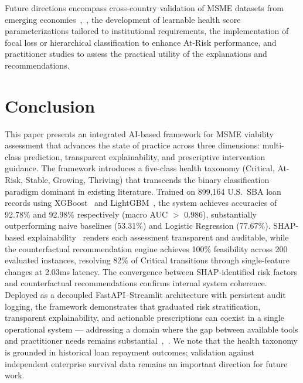 \documentclass[conference]{IEEEtran}
\begin{document}
Future directions encompass cross-country validation of MSME datasets from emerging economies~\cite{6},~\cite{7}, the development of learnable health score parameterizations tailored to institutional requirements, the implementation of focal loss or hierarchical classification to enhance At-Risk performance, and practitioner studies to assess the practical utility of the explanations and recommendations.


\section{Conclusion}

This paper presents an integrated AI-based framework for MSME viability assessment that advances the state of practice across three dimensions: multi-class prediction, transparent explainability, and prescriptive intervention guidance. The framework introduces a five-class health taxonomy (Critical, At-Risk, Stable, Growing, Thriving) that transcends the binary classification paradigm dominant in existing literature. Trained on 899,164 U.S.\ SBA loan records using XGBoost~\cite{10} and LightGBM~\cite{11}, the system achieves accuracies of 92.78\% and 92.98\% respectively (macro AUC $>$ 0.986), substantially outperforming naive baselines (53.31\%) and Logistic Regression (77.67\%). SHAP-based explainability~\cite{17} renders each assessment transparent and auditable, while the counterfactual recommendation engine achieves 100\% feasibility across 200 evaluated instances, resolving 82\% of Critical transitions through single-feature changes at 2.03ms latency. The convergence between SHAP-identified risk factors and counterfactual recommendations confirms internal system coherence. Deployed as a decoupled FastAPI--Streamlit architecture with persistent audit logging, the framework demonstrates that graduated risk stratification, transparent explainability, and actionable prescriptions can coexist in a single operational system --- addressing a domain where the gap between available tools and practitioner needs remains substantial~\cite{6},~\cite{7}. We note that the health taxonomy is grounded in historical loan repayment outcomes; validation against independent enterprise survival data remains an important direction for future work.
\end{document}
